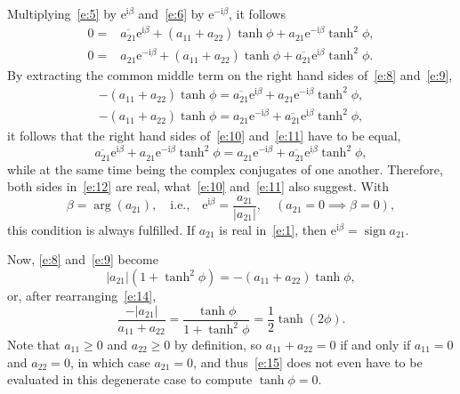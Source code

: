 \documentclass[a4paper,12pt,twoside]{article}
\begin{document}
Multiplying~\eqref{e:5} by $\mathrm{e}^{\mathrm{i}\beta}$
and~\eqref{e:6} by $\mathrm{e}^{-\mathrm{i}\beta}$, it follows
\begin{eqnarray}
  0=&\overline{a_{21}^{}}\mathrm{e}^{\mathrm{i}\beta}+(a_{11}^{}+a_{22}^{})\tanh\phi+a_{21}^{}\mathrm{e}^{-\mathrm{i}\beta}\tanh^2\phi,\label{e:8}\\
  0=&a_{21}^{}\mathrm{e}^{-\mathrm{i}\beta}+(a_{11}^{}+a_{22}^{})\tanh\phi+\overline{a_{21}^{}}\mathrm{e}^{\mathrm{i}\beta}\tanh^2\phi.\label{e:9}
\end{eqnarray}
By extracting the common middle term on the right hand sides of~\eqref{e:8} and~\eqref{e:9},
\begin{eqnarray}
  -(a_{11}^{}+a_{22}^{})\tanh\phi=\overline{a_{21}^{}}\mathrm{e}^{\mathrm{i}\beta}+a_{21}^{}\mathrm{e}^{-\mathrm{i}\beta}\tanh^2\phi,\label{e:10}\\
  -(a_{11}^{}+a_{22}^{})\tanh\phi=a_{21}^{}\mathrm{e}^{-\mathrm{i}\beta}+\overline{a_{21}^{}}\mathrm{e}^{\mathrm{i}\beta}\tanh^2\phi,\label{e:11}
\end{eqnarray}
it follows that the right hand sides of~\eqref{e:10} and~\eqref{e:11}
have to be equal,
\begin{equation}
  \overline{a_{21}^{}}\mathrm{e}^{\mathrm{i}\beta}+a_{21}^{}\mathrm{e}^{-\mathrm{i}\beta}\tanh^2\phi=a_{21}^{}\mathrm{e}^{-\mathrm{i}\beta}+\overline{a_{21}^{}}\mathrm{e}^{\mathrm{i}\beta}\tanh^2\phi,
  \label{e:12}
\end{equation}
while at the same time being the complex conjugates of one another.
Therefore, both sides in~\eqref{e:12} are real, what~\eqref{e:10}
and~\eqref{e:11} also suggest.  With
\begin{equation}
  \beta=\arg(a_{21}),\quad\text{i.e.,}\quad\mathrm{e}^{\mathrm{i}\beta}=\frac{a_{21}}{|a_{21}|},\quad(a_{21}=0\implies\beta=0),
  \label{e:13}
\end{equation}
this condition is always fulfilled.  If $a_{21}$ is real
in~\eqref{e:1}, then
$\mathrm{e}^{\mathrm{i}\beta}=\mathop{\mathrm{sign}}{a_{21}}$.

Now, \eqref{e:8} and~\eqref{e:9} become
\begin{equation}
  |a_{21}|(1+\tanh^2\phi)=-(a_{11}+a_{22})\tanh\phi,
  \label{e:14}
\end{equation}
or, after rearranging~\eqref{e:14},
\begin{equation}
  \frac{-|a_{21}|}{a_{11}+a_{22}}=\frac{\tanh\phi}{1+\tanh^2\phi}=\frac{1}{2}\tanh(2\phi).
  \label{e:15}
\end{equation}
Note that $a_{11}\ge 0$ and $a_{22}\ge 0$ by definition, so
$a_{11}+a_{22}=0$ if and only if $a_{11}=0$ and $a_{22}=0$, in which
case $a_{21}=0$, and thus~\eqref{e:15} does not even have to be
evaluated in this degenerate case to compute $\tanh\phi=0$.
\end{document}
